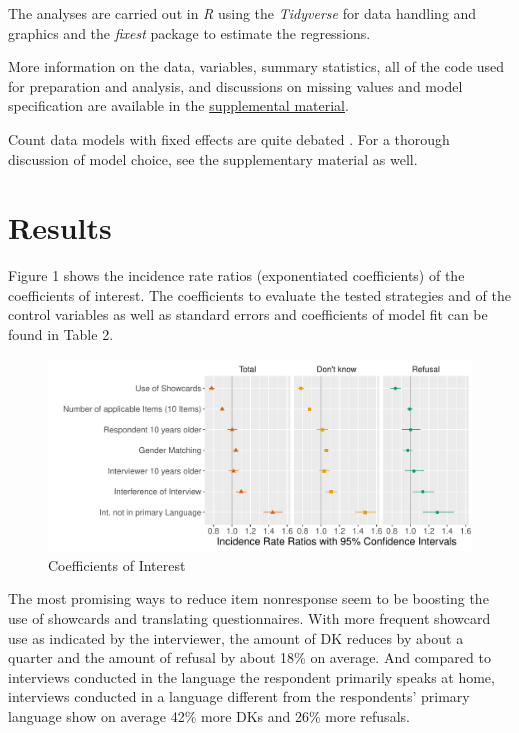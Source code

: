 \documentclass[a4paper,12pt]{article}
\begin{document}
The analyses are carried out in \textit{R} \citep{rcoreteamLanguageEnvironmentStatistical2023} using the \textit{Tidyverse} \citep{wickhamWelcomeTidyverse2019} for data handling and graphics and the \textit{fixest} package \citep{bergeEfficientEstimationMaximum2018} to estimate the regressions.

More information on the data, variables, summary statistics, all of the code used for preparation and analysis, and discussions on missing values and model specification are available in the  \href{https://doi.org/10.17605/OSF.IO/M83GY}{supplemental material}.

Count data models with fixed effects are quite debated \citep{wooldridgeDistributionfreeEstimationNonlinear1999, allisonFixedEffectsNegativeBinomial2002, cameronRegressionAnalysisCount2013}. For a thorough discussion of model choice, see the supplementary material as well.

\section{Results}

Figure 1 shows the incidence rate ratios (exponentiated coefficients) of the coefficients of interest. The coefficients to evaluate the tested strategies and of the control variables as well as standard errors and coefficients of model fit can be found in Table 2.

\begin{figure}
\centering
\caption{Coefficients of Interest}
\includegraphics[width=\linewidth]{results_inr_ess9.pdf}
\end{figure}

{\small

}

The most promising ways to reduce item nonresponse seem to be boosting the use of showcards and translating questionnaires. With more frequent showcard use as indicated by the interviewer, the amount of DK reduces by about a quarter and the amount of refusal by about 18\% on average. And compared to interviews conducted in the language the respondent primarily speaks at home, interviews conducted in a language different from the respondents' primary language show on average 42\% more DKs and 26\% more refusals.
\end{document}
